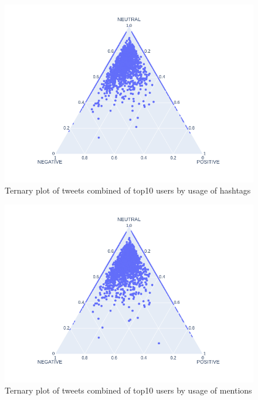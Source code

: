 \documentclass[conference]{IEEEtran}
\begin{document}
    \begin{figure}
        \includegraphics[scale=0.4]{figures/sentiment_ternary_amount_hashtags}
        \caption{Ternary plot of tweets combined of top10 users by usage of hashtags }
        \label{fig:sentiment-ternary-user-hashtag}
    \end{figure}

    \begin{figure}
        \includegraphics[scale=0.4]{figures/sentiment_ternary_amount_mentions}
        \caption{Ternary plot of tweets combined of top10 users by usage of mentions }
        \label{fig:sentiment-ternary-user-mention}
    \end{figure}
\end{document}
